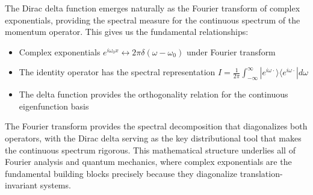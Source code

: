 \documentclass{article}
\begin{document}
The Dirac delta function emerges naturally as the Fourier transform of complex
exponentials, providing the spectral measure for the continuous spectrum of
the momentum operator. This gives us the fundamental relationships:
\begin{itemize}
  \item Complex exponentials $e^{i \omega_0 x} \leftrightarrow 2 \pi \delta
  (\omega - \omega_0)$ under Fourier transform
  
  \item The identity operator has the spectral representation $I = \frac{1}{2
  \pi}  \int_{- \infty}^{\infty} |e^{i \omega \cdot} \rangle \langle e^{i
  \omega \cdot} |d \omega$
  
  \item The delta function provides the orthogonality relation for the
  continuous eigenfunction basis
\end{itemize}
The Fourier transform provides the spectral decomposition that diagonalizes
both operators, with the Dirac delta serving as the key distributional tool
that makes the continuous spectrum rigorous. This mathematical structure
underlies all of Fourier analysis and quantum mechanics, where complex
exponentials are the fundamental building blocks precisely because they
diagonalize translation-invariant systems.

\
\end{document}
